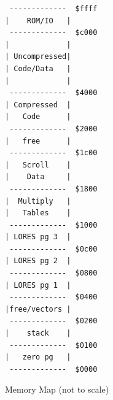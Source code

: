 \documentclass[twocolumn]{article}
\begin{document}


\begin{figure}
\begin{center}
\begin{scriptsize}
\begin{BVerbatim}
 -------------  $ffff
|    ROM/IO   |
 -------------  $c000
|             |
| Uncompressed|
| Code/Data   |
|             |
 -------------  $4000
| Compressed  |
|   Code      |
 -------------  $2000
|   free      |
 -------------  $1c00
|   Scroll    |
|    Data     |
 -------------  $1800
|  Multiply   |
|   Tables    |	
 -------------  $1000
| LORES pg 3  |
 -------------  $0c00
| LORES pg 2  |
 -------------  $0800
| LORES pg 1  |
 -------------  $0400
|free/vectors |
 -------------  $0200
|    stack    |
 -------------  $0100
|   zero pg   |
 -------------  $0000
\end{BVerbatim}
\end{scriptsize}
\end{center}
\caption{Memory Map (not to scale)\label{fig:map}}
\end{figure}
\end{document}
